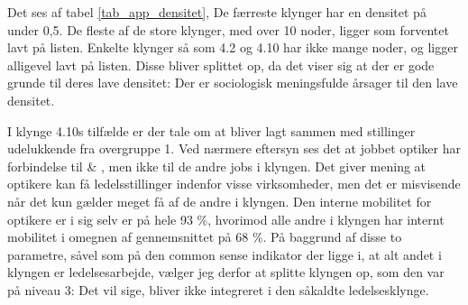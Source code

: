 Det ses af tabel \ref{tab_app_densitet}, De færreste klynger har en densitet på under 0,5. De fleste af de store klynger, med over 10 noder, ligger som forventet lavt på listen. Enkelte klynger så som 4.2 og 4.10 har ikke mange noder, og ligger alligevel lavt på listen. Disse bliver splittet op, da det viser sig at der er gode grunde til deres lave densitet: Der er sociologisk meningsfulde årsager til den lave densitet.

I klynge 4.10s tilfælde er der tale om at  bliver lagt sammen med stillinger udelukkende fra overgruppe 1. Ved nærmere eftersyn ses det at jobbet optiker har forbindelse til  & , men ikke til de andre jobs i klyngen. Det giver mening at optikere kan få ledelsstillinger indenfor visse virksomheder, men det er misvisende når det kun gælder meget få af de andre i klyngen. Den interne mobilitet for optikere er i sig selv er på hele 93 \%,  hvorimod alle andre i klyngen har internt mobilitet i omegnen af gennemsnittet på 68 \%. På baggrund af disse to parametre, såvel som på den common sense indikator der ligge i, at alt andet i klyngen er ledelsesarbejde,  vælger jeg derfor at splitte klyngen op, som den var på niveau 3: Det vil sige,  bliver ikke integreret i den såkaldte ledelsesklynge. 


 






